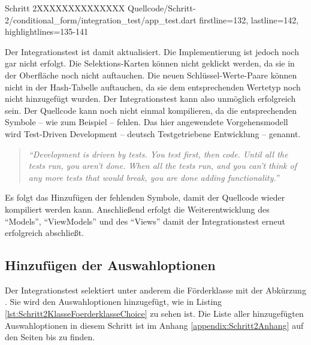 \begin{alexlisting}{Schritt 2}{XXXXXXXXXXXXXX}
  {Quellcode/Schritt-2/conditional_form/integration_test/app_test.dart}
  {firstline=132, lastline=142, highlightlines={135-141}}
  \label{lst:Schritt2ExpectedJson}
\end{alexlisting}

Der Integrationstest ist damit aktualisiert.
Die Implementierung ist jedoch noch gar nicht erfolgt.
Die Selektions-Karten können nicht geklickt werden, da sie in der Oberfläche noch nicht auftauchen.
Die neuen Schlüssel-Werte-Paare können nicht in der Hash-Tabelle auftauchen, da sie dem entsprechenden Wertetyp noch nicht hinzugefügt wurden.
Der Integrationstest kann also unmöglich erfolgreich sein.
Der Quellcode kann noch nicht einmal kompilieren, da die entsprechenden Symbole -- wie zum Beispiel  -- fehlen.
Das hier angewendete Vorgehensmodell wird Test-Driven Development -- deutsch Testgetriebene Entwicklung -- genannt.
 


\begin{quotation}
\textit{\enquote{Development is driven by tests.
You test first, then code.
Until all the tests run, you aren't
done.
When all the tests run, and you can't think of any more tests that would break, you
are done adding functionality.}}


\end{quotation}

Es folgt das Hinzufügen der fehlenden Symbole, damit der Quellcode wieder kompiliert werden kann.
Anschließend erfolgt die Weiterentwicklung des \enquote{Models}, \enquote{ViewModels} und des \enquote{Views} damit der Integrationstest erneut erfolgreich abschließt.


\subsection{Hinzufügen der Auswahloptionen}

Der Integrationstest selektiert unter anderem die Förderklasse mit der Abkürzung . Sie wird den Auswahloptionen hinzugefügt, wie in Listing \ref{lst:Schritt2KlasseFoerderklasseChoice} zu sehen ist.
Die Liste aller hinzugefügten Auswahloptionen in diesem Schritt ist im Anhang \ref{appendix:Schritt2Anhang} auf den Seiten \pageref{lst:Schritt2FoerderklasseChoicesKategorieChoices} bis \pageref{lst:Schritt2hauptzielsetzungLandChoices} zu finden.

